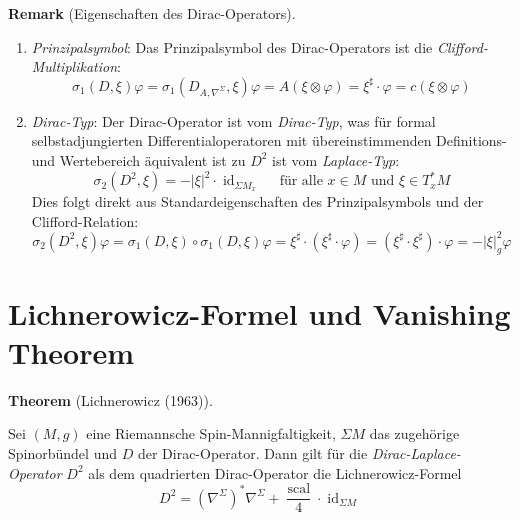 \documentclass[10pt, letterpaper]{article}
\newcommand{\CustomHeading}[3]{%
  \par\medskip\noindent%
  \textbf{#1 #2} \textnormal{(#3)}.\enskip%
}
\newenvironment{THEO}[2]{\CustomHeading{Theorem}{#1}{#2}}{}
\newenvironment{REM}[2]{\CustomHeading{Remark}{#1}{#2}}{}
\begin{document}
\begin{REM}{}{Eigenschaften des Dirac-Operators}
  \begin{enumerate}
    \item \emph{Prinzipalsymbol}: Das Prinzipalsymbol des Dirac-Operators ist die \emph{Clifford-Multiplikation}:
    $$\sigma_1(D, \xi) \varphi=\sigma_1\left(D_{A, \nabla^{\Sigma}}, \xi\right) \varphi = A(\xi \otimes \varphi)=\xi^{\sharp} \cdot \varphi=c(\xi\otimes \varphi)$$
    \item \emph{Dirac-Typ}: Der Dirac-Operator ist vom \emph{Dirac-Typ}, was für formal selbstadjungierten Differentialoperatoren mit übereinstimmenden Definitions- und Wertebereich äquivalent ist zu $D^2$ ist vom \emph{Laplace-Typ}:
    $$\sigma_2(D^2, \xi)=-|\xi|^2 \cdot \operatorname{id}_{\Sigma M_x} \quad \text{ für alle } x \in M \text{ und } \xi \in T_x^* M$$
    Dies folgt direkt aus Standardeigenschaften des Prinzipalsymbols und der Clifford-Relation:
    $$\sigma_2(D^2,\xi)\varphi=\sigma_1(D,\xi)\circ\sigma_1(D,\xi)\varphi=\xi^\sharp\cdot(\xi^\sharp\cdot \varphi)=(\xi^\sharp\cdot\xi^\sharp)\cdot \varphi=-|\xi|_g^2\varphi$$


    
    
  \end{enumerate}
\end{REM}





\section{Lichnerowicz-Formel und Vanishing Theorem}






\begin{THEO}{}{Lichnerowicz (1963)}
Sei $(M,g)$ eine Riemannsche Spin-Mannigfaltigkeit, $\Sigma M$ das zugehörige
Spinorbündel und $D$ der Dirac-Operator. Dann gilt für die \emph{Dirac-Laplace-Operator} $D^2$ als dem quadrierten Dirac-Operator die Lichnerowicz-Formel
$$
D^2=\left(\nabla^{\Sigma}\right)^* \nabla^{\Sigma}+\frac{\operatorname{scal}}{4} \cdot \operatorname{id}_{\Sigma M}
$$  
\end{THEO}
\end{document}
